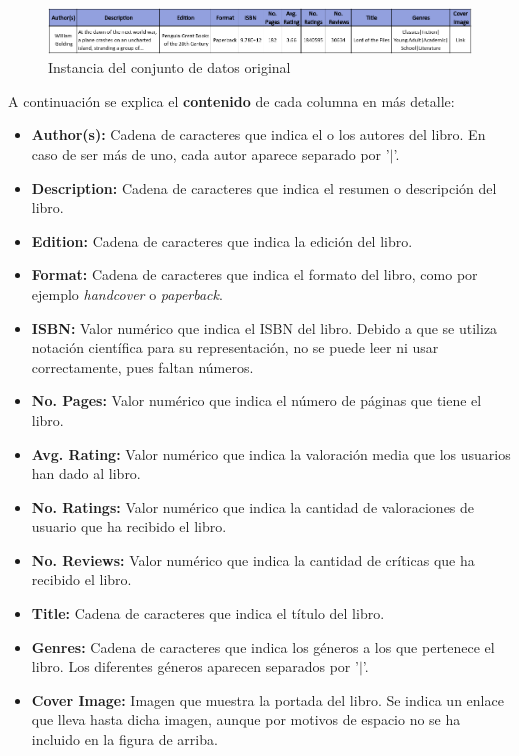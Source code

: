 \documentclass[12pt,a4paper, xcolor=table]{article}
\begin{document}
    \vspace{3mm}

    \begin{figure}[!h]
        \centering
        \includegraphics[width=500px]{img/instancia_dataset_original.png}
        \caption{Instancia del conjunto de datos original}
    \end{figure}

    \vspace{3mm}

    A continuación se explica el \textbf{contenido} de cada columna en más detalle:

    \begin{itemize}
        \item \textbf{Author(s):} Cadena de caracteres que indica el o los autores del libro. En caso de ser más de uno, cada autor aparece separado por '$\mid$'.
        \item \textbf{Description:} Cadena de caracteres que indica el resumen o descripción del libro.
        \item \textbf{Edition:} Cadena de caracteres que indica la edición del libro.
        \item \textbf{Format:} Cadena de caracteres que indica el formato del libro, como por ejemplo \textit{handcover} o \textit{paperback}.
        \item \textbf{ISBN:} Valor numérico que indica el ISBN del libro. Debido a que se utiliza notación científica para su representación, no se puede leer ni usar correctamente, pues faltan números.
        \item \textbf{No. Pages:} Valor numérico que indica el número de páginas que tiene el libro.
        \item \textbf{Avg. Rating:} Valor numérico que indica la valoración media que los usuarios han dado al libro.
        \item \textbf{No. Ratings:}  Valor numérico que indica la cantidad de valoraciones de usuario que ha recibido el libro.
        \item \textbf{No. Reviews:} Valor numérico que indica la cantidad de críticas que ha recibido el libro.
        \item \textbf{Title:} Cadena de caracteres que indica el título del libro.
        \item \textbf{Genres:} Cadena de caracteres que indica los géneros a los que pertenece el libro. Los diferentes géneros aparecen separados por '$\mid$'.
        \item \textbf{Cover Image:} Imagen que muestra la portada del libro. Se indica un enlace que lleva hasta dicha imagen, aunque por motivos de espacio no se ha incluido en la figura de arriba.
    \end{itemize}
\end{document}
